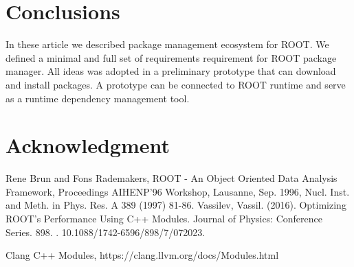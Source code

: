 \documentclass{webofc}
\begin{document}
\section{Conclusions}

In these article we described package management ecosystem for ROOT. We defined a minimal and full set of requirements requirement for ROOT package manager. All ideas was adopted in a preliminary prototype that can download and install packages. A prototype can be connected to ROOT runtime and serve as a runtime dependency management tool.

\section{Acknowledgment}

%
% 
%
%
\begin{thebibliography}{}
%

Rene Brun and Fons Rademakers, ROOT - An Object Oriented Data Analysis Framework, Proceedings AIHENP'96 Workshop, Lausanne, Sep. 1996, Nucl. Inst. and Meth. in Phys. Res. A 389 (1997) 81-86.
%
Vassilev, Vassil. (2016). Optimizing ROOT's Performance Using C++ Modules. Journal of Physics: Conference Series. 898. . 10.1088/1742-6596/898/7/072023.

Clang C++ Modules, https://clang.llvm.org/docs/Modules.html


\end{thebibliography}
\end{document}
